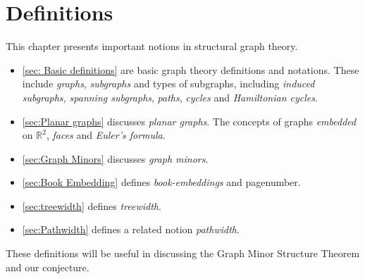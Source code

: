 \chapter{Definitions}\label{chap:Definitions}
This chapter presents important notions in structural graph theory.
\begin{itemize}
	\item \cref{sec: Basic definitions} are basic graph theory definitions and notations. These include \textit{graphs}, \textit{subgraphs} and types of subgraphs, including \textit{induced subgraphs,} \textit{spanning subgraphs}, \textit{paths}, \textit{cycles} and \textit{Hamiltonian cycles}. 
	\item \cref{sec:Planar graphs} discusses \textit{planar graphs}. The concepts of graphs \textit{embedded} on $\mathbb{R}^2$, \textit{faces} and \textit{Euler's formula}.
	\item \cref{sec:Graph Minors} discusses \textit{graph minors}.
	\item \cref{sec:Book Embedding} defines \textit{book-embeddings} and pagenumber.
	\item \cref{sec:treewidth} defines \textit{treewidth}.
	\item \cref{sec:Pathwidth} defines a related notion \textit{pathwidth}.
\end{itemize}
These definitions will be useful in discussing the Graph Minor Structure Theorem and our conjecture.









